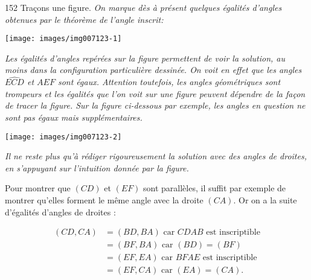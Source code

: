 \begin{Soln}{152}
Traçons une figure. \emph{On marque dès à présent quelques égalités d'angles obtenues par le théorème de l'angle inscrit:}

\begin{center}
\texttt{[image: images/img007123-1]}
\end{center}

\emph{Les égalités d'angles repérées sur la figure permettent de voir la solution, au moins dans la configuration particulière dessinée. On voit en effet que les angles $\widehat{ECD}$ et $\widehat{AEF}$ sont égaux. Attention toutefois, les angles géométriques sont trompeurs et les égalités que l'on voit sur une figure peuvent dépendre de la façon de tracer la figure. Sur la figure ci-dessous par exemple, les angles en question ne sont pas égaux mais supplémentaires.}

\begin{center}
\texttt{[image: images/img007123-2]}
\end{center}


\emph{Il ne reste plus qu'à rédiger rigoureusement la solution  avec des angles de droites, en s'appuyant sur l'intuition donnée par la figure.}

Pour montrer que $(CD)$ et $(EF)$ sont parallèles, il suffit par exemple de montrer qu'elles forment le même angle avec la droite $(CA)$. Or on a la suite d'égalités d'angles de droites :

\begin{align*}
(CD,CA) &= (BD,BA) \text{ car $CDAB$ est inscriptible}\\
&= (BF,BA) \text{ car $(BD)=(BF)$}\\
&=(EF,EA) \text{ car $BFAE$ est inscriptible}\\
&=(EF,CA)  \text{ car $(EA)=(CA)$.}
\end{align*}

\end{Soln}
